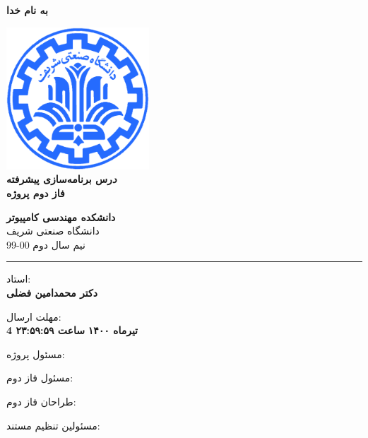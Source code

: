 \documentclass[]{article}
\begin{document}
\begin{titlepage}
\begin{center}

\textbf{ \Huge{به نام خدا} }
        
\vspace{0.2cm}

\includegraphics[width=0.4\textwidth]{sharif1.png}\\
\vspace{0.2cm}
\textbf{ \Huge{\emph درس برنامه‌سازی پیشرفته} }\\
\vspace{0.25cm}
\textbf{ \Large{ فاز دوم پروژه} }
\vspace{0.2cm}
       
 
      \large \textbf{دانشکده مهندسی کامپیوتر}\\\vspace{0.1cm}
    \large   دانشگاه صنعتی شریف\\\vspace{0.2cm}
       \large   ﻧﯿﻢ سال دوم 00-99 \\\vspace{0.10cm}
      \noindent\rule[1ex]{\linewidth}{1pt}
استاد:\\
    \textbf{{دکتر محمدامین فضلی}}



    \vspace{0.20cm}

   مهلت ارسال:\\
    \textbf{{4 تیرماه ۱۴۰۰}}
    \textbf{{ساعت ۲۳:۵۹:۵۹}}

    \vspace{0.10cm}
مسئول پروژه:\\
    \textbf{}
    
        \vspace{0.10cm}
مسئول فاز دوم:\\
    \textbf{}
    
        \vspace{0.10cm}
طراحان فاز دوم:\\
    \textbf{}
    
        \vspace{0.05cm}
مسئولین تنظیم مستند:\\
    \textbf{}
    

\end{center}
\end{titlepage}
\end{document}
